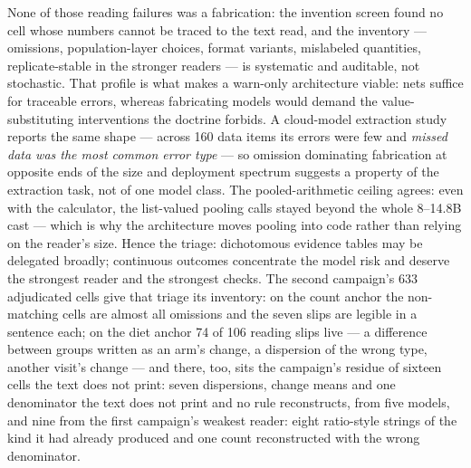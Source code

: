 \documentclass[11pt]{article}
\begin{document}
None of those reading failures was a fabrication: the invention screen found no cell whose numbers cannot be traced to the text read, and the inventory --- omissions, population-layer choices, format variants, mislabeled quantities, replicate-stable in the stronger readers --- is systematic and auditable, not stochastic. That profile is what makes a warn-only architecture viable: nets suffice for traceable errors, whereas fabricating models would demand the value-substituting interventions the doctrine forbids. A cloud-model extraction study reports the same shape --- across 160 data items its errors were few and \emph{missed data was the most common error type} \citep{gartlehner2024extraction} --- so omission dominating fabrication at opposite ends of the size and deployment spectrum suggests a property of the extraction task, not of one model class. The pooled-arithmetic ceiling agrees: even with the calculator, the list-valued pooling calls stayed beyond the whole 8--14.8B cast --- which is why the architecture moves pooling into code rather than relying on the reader's size. Hence the triage: dichotomous evidence tables may be delegated broadly; continuous outcomes concentrate the model risk and deserve the strongest reader and the strongest checks. The second campaign's 633 adjudicated cells give that triage its inventory: on the count anchor the non-matching cells are almost all omissions and the seven slips are legible in a sentence each; on the diet anchor 74 of 106 reading slips live --- a difference between groups written as an arm's change, a dispersion of the wrong type, another visit's change --- and there, too, sits the campaign's residue of sixteen cells the text does not print: seven dispersions, change means and one denominator the text does not print and no rule reconstructs, from five models, and nine from the first campaign's weakest reader: eight ratio-style strings of the kind it had already produced and one count reconstructed with the wrong denominator.
\end{document}
